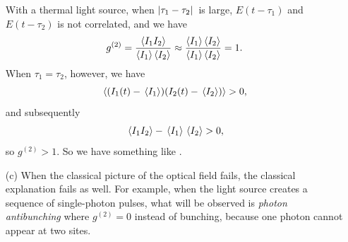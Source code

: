 \documentclass[hyperref, a4paper]{article}
\begin{document}
\begin{itemize}
    With a thermal light source, when $\abs*{\tau_1 - \tau_2}$ is large, $E(t - \tau_1)$ and $E(t - \tau_2)$ is not correlated, and we have 
    \[
        g^{(2)} = \frac{\expval{I_1 I_2}}{\expval{I_1} \expval{I_2}} \approx \frac{\expval{I_1} \expval{I_2}}{\expval{I_1} \expval{I_2}} = 1.
    \]
    When $\tau_1 = \tau_2$, however, we have 
    \[
        \expval{(I_1(t) - \expval*{I_1}) (I_2(t) - \expval*{I_2})} > 0,
    \]
    and subsequently
    \[
        \expval*{I_1 I_2} - \expval*{I_1} \expval*{I_2} > 0, 
    \]
    so $g^{(2)} > 1$.
    So we have something like .


    \item[(c)] When the classical picture of the optical field fails, the classical explanation fails as well.
    For example, when the light source creates a sequence of single-photon pulses, what will be observed is \emph{photon antibunching} where $g^{(2)} = 0$ instead of bunching, because one photon cannot appear at two sites.
\end{itemize}

\paragraph{}
\end{document}
